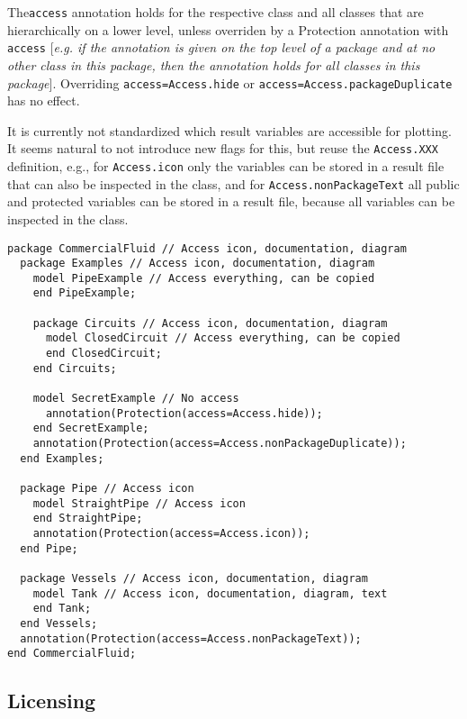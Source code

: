 The\lstinline!access! annotation holds for the respective class and all classes
that are hierarchically on a lower level, unless overriden by a
Protection annotation with \lstinline!access! {[}\emph{e.g. if the annotation is
given on the top level of a package and at no other class in this
package, then the annotation holds for all classes in this package}{]}.
Overriding \lstinline!access=Access.hide! or \lstinline!access=Access.packageDuplicate!
has no effect.

\begin{nonnormative}
It is currently not standardized which result variables are
accessible for plotting. It seems natural to not introduce new flags for
this, but reuse the \lstinline!Access.XXX! definition, e.g., for \lstinline!Access.icon!
only the variables can be stored in a result file that can also be
inspected in the class, and for \lstinline!Access.nonPackageText! all public
and protected variables can be stored in a result file, because all
variables can be inspected in the class.

\begin{lstlisting}[language=modelica]
package CommercialFluid // Access icon, documentation, diagram
  package Examples // Access icon, documentation, diagram
    model PipeExample // Access everything, can be copied
    end PipeExample;

    package Circuits // Access icon, documentation, diagram
      model ClosedCircuit // Access everything, can be copied
      end ClosedCircuit;
    end Circuits;

    model SecretExample // No access
      annotation(Protection(access=Access.hide));
    end SecretExample;
    annotation(Protection(access=Access.nonPackageDuplicate));
  end Examples;

  package Pipe // Access icon
    model StraightPipe // Access icon
    end StraightPipe;
    annotation(Protection(access=Access.icon));
  end Pipe;

  package Vessels // Access icon, documentation, diagram
    model Tank // Access icon, documentation, diagram, text
    end Tank;
  end Vessels;
  annotation(Protection(access=Access.nonPackageText));
end CommercialFluid;
\end{lstlisting}
\end{nonnormative}

\subsection{Licensing}


